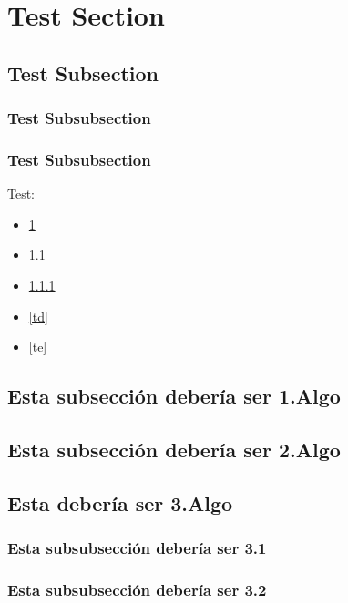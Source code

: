 \section{Test Section} \label{ta}
	\subsection{Test Subsection} \label{tb}
		\subsubsection{Test Subsubsection} \label{tc}
			 \label{td}
			 \label{te}
		\subsubsection{Test Subsubsection}
		
		Test:
		\begin{itemize}
			\item \ref{ta}
			\item \ref{tb}
			\item \ref{tc}
			\item \ref{td}
			\item \ref{te}
		\end{itemize}

	\subsection{Esta subsección debería ser 1.Algo}
	\subsection{Esta subsección debería ser 2.Algo}
	\subsection{Esta debería ser 3.Algo}
		\subsubsection{Esta subsubsección debería ser 3.1}
		\subsubsection{Esta subsubsección debería ser 3.2}

